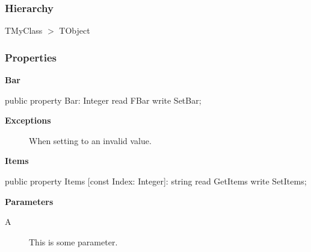 \documentclass{report}
\newif\ifpdf
\begin{document}
\subsubsection*{\large{\textbf{Hierarchy}}\normalsize\hspace{1ex}\hfill}
TMyClass {$>$} TObject
\subsubsection*{\large{\textbf{Properties}}\normalsize\hspace{1ex}\hfill}
\begin{list}{}{
\setlength{\itemindent}{0cm}
\setlength{\listparindent}{0cm}
\setlength{\leftmargin}{\evensidemargin}
\addtolength{\leftmargin}{\tmplength}
\settowidth{\labelsep}{X}
\addtolength{\leftmargin}{\labelsep}
\setlength{\labelwidth}{\tmplength}
}
\label{A.TMyClass-Bar}
\item[\textbf{Bar}\hfill]
\ifpdf
\begin{flushleft}
\fi
\begin{ttfamily}
public property Bar: Integer read FBar write SetBar;\end{ttfamily}

\ifpdf
\end{flushleft}
\fi


\par  \par
\item[\textbf{Exceptions}]
\begin{description}
\item[\begin{ttfamily}TMyException\end{ttfamily}(\ref{A.TMyException})] When setting to an invalid value.
\end{description}
\label{A.TMyClass-Items}
\item[\textbf{Items}\hfill]
\ifpdf
\begin{flushleft}
\fi
\begin{ttfamily}
public property Items [const Index: Integer]: string read GetItems write SetItems;\end{ttfamily}

\ifpdf
\end{flushleft}
\fi


\par  \par
\item[\textbf{Parameters}]
\begin{description}
\item[A] This is some parameter.
\end{description}
\end{list}
\end{document}
